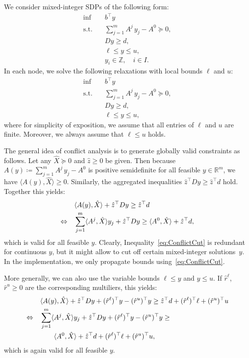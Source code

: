 \documentclass[10pt, a4paper]{article}
\newcommand{\define}{\coloneqq}
\newcommand{\skal}[2]{\langle{#1},{#2}\rangle}
\newcommand{\T}{^{\top}}
\newcommand{\R}{\mathds{R}}
\newcommand{\Z}{\mathds{Z}}
\begin{document}
We consider mixed-integer SDPs of the following form:
\begin{equation}\label{MISDP}
  \begin{aligned}
    \inf \quad & b\T y \\
    \text{s.t.} \quad & \sum_{j=1}^m A^j\, y_j - A^0 \succeq 0, \\
    & D y \geq d,\\
    & \ell \leq y \leq u,\\
    & y_i \in \Z,\quad i \in I.
  \end{aligned}
\end{equation}
In each node, we solve the following relaxations with local bounds $\ell$
and $u$:
\begin{equation}\label{SDP-D}
  \begin{aligned}
    \inf \quad & b\T y \\
    \text{s.t.} \quad & \sum_{j=1}^m A^j\, y_j - A^0 \succeq 0, \\
    & D y \geq d,\\
    & \ell \leq y \leq u,
  \end{aligned}
\end{equation}
where for simplicity of exposition, we assume that all entries of $\ell$
and $u$ are finite. Moreover, we always assume that $\ell \leq u$ holds.

The general idea of conflict analysis is to generate globally valid
constraints as follows. Let any $\hat{X} \succeq 0$ and $\hat{z} \geq 0$ be
given. Then because $A(y) \define \sum_{j=1}^m A^j\, y_j - A^0$ is positive
semidefinite for all feasible $y \in \R^m$, we have
$\skal{A(y)}{\hat{X}} \geq 0$.  Similarly, the aggregated inequalities
$\hat{z}\T D y \geq \hat{z}\T d$ hold. Together this yields:
\begin{align}
  & \skal{A(y)}{\hat{X}} + \hat{z}\T D y \geq \hat{z}\T d\notag\\
  \Leftrightarrow\quad
  & \sum_{j=1}^m \skal{A^j}{\hat{X}} y_j + \hat{z}\T D y \geq
    \skal{A^0}{\hat{X}} + \hat{z}\T d,\label{eq:ConflictCut}
\end{align}
which is valid for all feasible $y$. Clearly,
Inequality~\eqref{eq:ConflictCut} is redundant for continuous $y$, but it
might allow to cut off certain mixed-integer solutions~$y$. In the implementation,
we only propagate bounds using~\eqref{eq:ConflictCut}.


More generally, we can also use the variable bounds $\ell \leq y$ and
$y \leq u$. If $\hat{r}^\ell$, $\hat{r}^u \geq 0$ are the corresponding
multiliers, this yields:
\begin{align}
  & \skal{A(y)}{\hat{X}} + \hat{z}\T D y + (\hat{r}^\ell)\T y - (\hat{r}^u)\T y
    \geq \hat{z}\T d + (\hat{r}^\ell)\T \ell + (\hat{r}^u)\T u\notag\\
  \Leftrightarrow\quad
  & \sum_{j=1}^m \skal{A^j}{\hat{X}} y_j + \hat{z}\T D y +
    (\hat{r}^\ell)\T y - (\hat{r}^u)\T y \geq \\
  & \qquad \skal{A^0}{\hat{X}} +
    \hat{z}\T d + (\hat{r}^\ell)\T \ell + (\hat{r}^u)\T u,\label{eq:ConflictCut2}
\end{align}
which is again valid for all feasible $y$.
\end{document}
